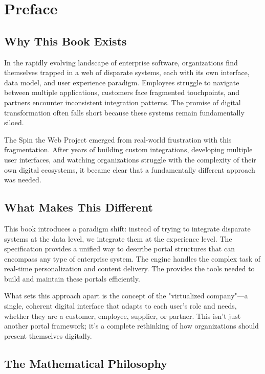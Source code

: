 
\chapter*{Preface}

\section*{Why This Book Exists}

In the rapidly evolving landscape of enterprise software, organizations find themselves trapped in a web of disparate systems, each with its own interface, data model, and user experience paradigm. Employees struggle to navigate between multiple applications, customers face fragmented touchpoints, and partners encounter inconsistent integration patterns. The promise of digital transformation often falls short because these systems remain fundamentally siloed.

The Spin the Web Project emerged from real-world frustration with this fragmentation. After years of building custom integrations, developing multiple user interfaces, and watching organizations struggle with the complexity of their own digital ecosystems, it became clear that a fundamentally different approach was needed.

\section*{What Makes This Different}

This book introduces a paradigm shift: instead of trying to integrate disparate systems at the data level, we integrate them at the experience level. The \wbdl specification provides a unified way to describe portal structures that can encompass any type of enterprise system. The \webspinner engine handles the complex task of real-time personalization and content delivery. The \studio provides the tools needed to build and maintain these portals efficiently.

What sets this approach apart is the concept of the "virtualized company"—a single, coherent digital interface that adapts to each user's role and needs, whether they are a customer, employee, supplier, or partner. This isn't just another portal framework; it's a complete rethinking of how organizations should present themselves digitally.

\section*{The Mathematical Philosophy}

